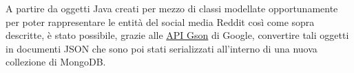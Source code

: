 \newpage



A partire da oggetti Java creati per mezzo di classi modellate opportunamente per poter rappresentare le entit{\`a} del social media Reddit cos{\`i} come sopra descritte, {\`e} stato possibile, grazie alle \href{https://github.com/google/gson}{API Gson} di Google, convertire tali oggetti in documenti JSON che sono poi stati serializzati all'interno di una nuova collezione di MongoDB. 